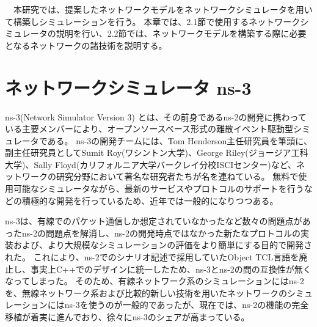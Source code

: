 \begin{comment}
QoE（Quality of Experience）とは，ユーザの満足レベルを定量的に示す指標である．この指標は，ネットワーク自体ではなくその上で提供されるIPTV等のアプリケーションサービスの体感品質のことである．たとえば，IPTVサービスの場合映像・音声の品質，チャンネルの切替え・早送り巻戻しなどのスムーズさ，その他使い勝手全般がQoEとなる．
QoS同様，QoEは評価項目を可能な限り数値指標として記述される．QoEは，ユーザ自身があるサービスについて評価を行い，その評価を数値として可視化したものがQoEとなる．QoSはネットワーク性能を，QoEはユーザーの体感品質をそれぞれ対象とする．つまり，QoS は通信事業者やサービス提供者から見たサービス品質の尺度であり，QoE はユーザーから見たサービス品質の尺度となる\cite{QoE}．
\end{comment}


　本研究では、提案したネットワークモデルをネットワークシミュレータを用いて構築しシミュレーションを行う。
本章では、2.1節で使用するネットワークシミュレータの説明を行い、2.2節では、ネットワークモデルを構築する際に必要となるネットワークの諸技術を説明する。

\section{ネットワークシミュレータ ns-3}

ns-3(Network Simulator Version 3)\cite{ns3} \cite{ns3text} とは、その前身であるns-2の開発に携わっている主要メンバーにより、オープンソースベース形式の離散イベント駆動型シミュレータである。
ns-3の開発チームには、Tom Henderson主任研究員を筆頭に、副主任研究員としてSumit Roy(ワシントン大学)、George Riley(ジョージア工科大学)、Sally Floyd(カリフォルニア大学バークレイ分校ISCIセンター)など、ネットワークの研究分野において著名な研究者たちが名を連ねている。
無料で使用可能なシミュレータながら、最新のサービスやプロトコルのサポートを行うなどの積極的な開発を行っているため、近年では一般的になりつつある。

ns-3は、有線でのパケット通信しか想定されていなかったなど数々の問題点があったns-2の問題点を解消し、ns-2の開発時点ではなかった新たなプロトコルの実装および、より大規模なシミュレーションの評価をより簡単にする目的で開発された。
これにより、ns-2でのシナリオ記述で採用していたObject TCL言語を廃止し、事実上C++でのデザインに統一したため、ns-3とns-2の間の互換性が無くなってしまった。
そのため、有線ネットワーク系のシミュレーションにはns-2を、無線ネットワーク系および比較的新しい技術を用いたネットワークのシミュレーションにはns-3を使うのが一般的であったが、現在では、ns-2の機能の完全移植が着実に進んでおり、徐々にns-3のシェアが高まっている。 \\

